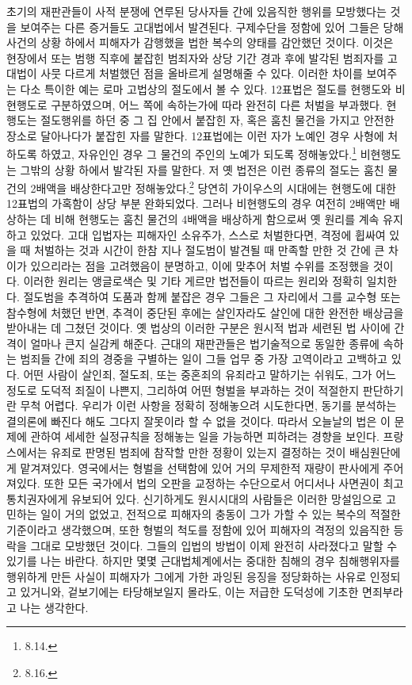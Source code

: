 초기의 재판관들이 사적 분쟁에 연루된 당사자들 간에 있음직한 행위를
모방했다는 것을 보여주는 다른 증거들도 고대법에서 발견된다.
구제수단을 정함에 있어
그들은 당해 사건의 상황 하에서 피해자가 감행했을 법한 복수의 양태를
감안했던 것이다.
이것은 현장에서 또는 범행 직후에 붙잡힌 범죄자와
상당 기간 경과 후에 발각된 범죄자를
고대법이
사뭇 다르게 처벌했던 점을 올바르게 설명해줄 수 있다.
이러한 차이를 보여주는 다소 특이한 예는 로마 고법상의 절도에서 볼 수 있다.
12표법은 절도를
현행도와
비현행도로
구분하였으며,
어느 쪽에 속하는가에 따라 완전히 다른 처벌을 부과했다.
현행도는 절도행위를 하던 중 그 집 안에서 붙잡힌 자,
혹은 훔친 물건을 가지고 안전한 장소로 달아나다가 붙잡힌 자를 말한다.
12표법에는 이런 자가 노예인 경우 사형에 처하도록 하였고,
자유인인 경우 그 물건의 주인의 노예가 되도록 정해놓았다.\footnote{%
  8.14.}
비현행도는 그밖의 상황 하에서 발각된 자를 말한다.
저 옛 법전은 이런 종류의 절도는 훔친 물건의 2배액을 배상한다고만
정해놓았다.\footnote{%
  8.16.}
당연히
가이우스의 시대에는
현행도에 대한 12표법의 가혹함이 상당 부분 완화되었다.
그러나
비현행도의 경우 여전히 2배액만 배상하는 데 비해
현행도는 훔친 물건의 4배액을 배상하게 함으로써
옛 원리를 계속 유지하고 있었다.
고대 입법자는
피해자인 소유주가,
스스로 처벌한다면,
격정에 휩싸여 있을 때 처벌하는 것과
시간이 한참 지나 절도범이 발견될 때 만족할 만한 것 간에
큰 차이가 있으리라는 점을 고려했음이 분명하고,
이에 맞추어 처벌 수위를 조정했을 것이다.
이러한 원리는 앵글로색슨 및 기타 게르만 법전들이 따르는 원리와
정확히 일치한다.
절도범을 추격하여 도품과 함께 붙잡은 경우 그들은
그 자리에서 그를 교수형 또는 참수형에 처했던 반면,
추격이 중단된 후에는 살인자라도 살인에 대한 완전한 배상금을 받아내는 데
그쳤던 것이다.
옛 법상의 이러한 구분은 원시적 법과 세련된 법 사이에
간격이 얼마나 큰지 실감케 해준다.
근대의 재판관들은
법기술적으로 동일한 종류에 속하는 범죄들 간에
죄의 경중을 구별하는 일이
그들 업무 중 가장 고역이라고 고백하고 있다.
어떤 사람이 살인죄, 절도죄, 또는 중혼죄의 유죄라고
말하기는 쉬워도, 그가 어느 정도로 도덕적 죄질이 나쁜지,
그리하여
어떤 형벌을 부과하는 것이 적절한지
판단하기란 무척 어렵다.
우리가 이런 사항을 정확히 정해놓으려 시도한다면,
동기를 분석하는 결의론에 빠진다 해도
그다지 잘못이라 할 수 없을 것이다.
따라서 오늘날의 법은
이 문제에 관하여 세세한 실정규칙을 정해놓는 일을
가능하면 피하려는 경향을 보인다.
프랑스에서는
유죄로 판명된 범죄에 참작할 만한 정황이 있는지 결정하는 것이
배심원단에게 맡겨져있다.
영국에서는
형벌을 선택함에 있어 거의 무제한적 재량이
판사에게 주어져있다.
또한 모든 국가에서
법의 오판을 교정하는 수단으로서
어디서나 사면권이 최고 통치권자에게 유보되어 있다.
신기하게도
원시시대의 사람들은 이러한 망설임으로 고민하는 일이 거의 없었고,
전적으로
피해자의 충동이 그가 가할 수 있는 복수의 적절한 기준이라고 생각했으며,
또한 형벌의 척도를 정함에 있어
피해자의 격정의 있음직한 등락을 그대로 모방했던 것이다.
그들의 입법의 방법이 이제 완전히 사라졌다고 말할 수 있기를 나는 바란다.
하지만 몇몇 근대법체계에서는
중대한 침해의 경우
침해행위자를 행위하게 만든 사실이
피해자가 그에게 가한 과잉된 응징을
정당화하는 사유로 인정되고 있거니와,
겉보기에는 타당해보일지 몰라도,
이는
저급한 도덕성에 기초한 면죄부라고 나는 생각한다.

